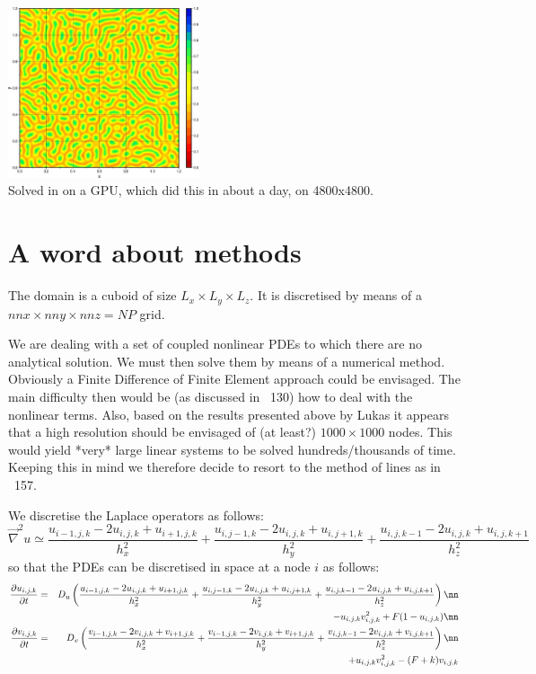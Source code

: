 \begin{center}
\includegraphics[width=5.6cm]{python_codes/fieldstone_171/images/uu000020.jpg}\\
{\captionfont Solved in on a GPU, which did this in about a day, on 4800x4800.}
\end{center}

\section*{A word about methods}

The domain is a cuboid of size $L_x \times L_y \times L_z$.
It is discretised by means of a $nnx \times nny \times nnz = NP$ grid.

We are dealing with a set of coupled nonlinear PDEs to which there are no analytical solution.
We must then solve them by means of a numerical method. 
Obviously a Finite Difference of Finite Element approach could be envisaged. The main difficulty then
would be (as discussed in \stone~130) how to deal with the nonlinear terms. Also, based on 
the results presented above by Lukas it appears that a high resolution should be envisaged
of (at least?) $1000\times 1000$ nodes. This would yield *very* large linear systems to be 
solved hundreds/thousands of time.
Keeping this in mind we therefore decide to resort to the method of lines as in \stone~157.

We discretise the Laplace operators as follows:
\[
\vec\nabla^2 u \simeq 
\frac{u_{i-1,j,k}-2u_{i,j,k}+u_{i+1,j,k}}{h_x^2} + 
\frac{u_{i,j-1,k}-2u_{i,j,k}+u_{i,j+1,k}}{h_y^2} + 
\frac{u_{i,j,k-1}-2u_{i,j,k}+u_{i,j,k+1}}{h_z^2} 
\]
so that the PDEs can be discretised in space at a node $i$ as follows:
\begin{eqnarray}
\frac{\partial u_{i,j,k}}{\partial t} 
&=& D_u 
\left(
\frac{u_{i-1,j,k}-2u_{i,j,k}+u_{i+1,j,k}}{h_x^2} + 
\frac{u_{i,j-1,k}-2u_{i,j,k}+u_{i,j+1,k}}{h_y^2} + 
\frac{u_{i,j,k-1}-2u_{i,j,k}+u_{i,j,k+1}}{h_z^2} 
\right) \nn\\
&&- u_{i,j,k}v_{i,j,k}^2 + F(1-u_{i,j,k}) 
\nn\\
\frac{\partial v_{i,j,k}}{\partial t} &=& D_v 
\left(
\frac{v_{i-1,j,k}-2v_{i,j,k}+v_{i+1,j,k}}{h_x^2} + 
\frac{v_{i-1,j,k}-2v_{i,j,k}+v_{i+1,j,k}}{h_y^2} + 
\frac{v_{i,j,k-1}-2v_{i,j,k}+v_{i,j,k+1}}{h_z^2} 
\right) \nn\\
&&
+ u_{i,j,k}v_{i,j,k}^2 - (F+k)v_{i,j,k}
\end{eqnarray}

